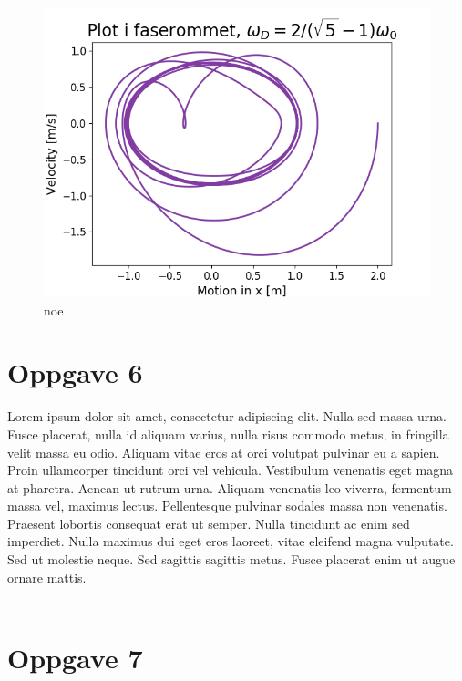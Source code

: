 \documentclass[norsk,a4paper,12pt]{article}
\begin{document}
\begin{figure}[h]
\begin{center}
\includegraphics[scale=0.8]{Oppgave5del2.png}
\caption{noe}
\label{fig:faseplot5del2.png}
\end{center}
\end{figure}



\section*{Oppgave 6}

Lorem ipsum dolor sit amet, consectetur adipiscing elit. Nulla sed massa urna. Fusce placerat, nulla id aliquam varius, nulla risus commodo metus, in fringilla velit massa eu odio. Aliquam vitae eros at orci volutpat pulvinar eu a sapien. Proin ullamcorper tincidunt orci vel vehicula. Vestibulum venenatis eget magna at pharetra. Aenean ut rutrum urna. Aliquam venenatis leo viverra, fermentum massa vel, maximus lectus. Pellentesque pulvinar sodales massa non venenatis. Praesent lobortis consequat erat ut semper. Nulla tincidunt ac enim sed imperdiet. Nulla maximus dui eget eros laoreet, vitae eleifend magna vulputate. Sed ut molestie neque. Sed sagittis sagittis metus. Fusce placerat enim ut augue ornare mattis.
\\
\\

\section*{Oppgave 7}
\end{document}
